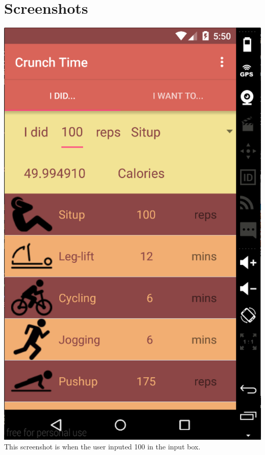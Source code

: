 \documentclass[11pt]{article}
\begin{document}
\section{Screenshots}
\includegraphics[scale=0.3]{shot1.png}\\
This screenshot is when the user inputed 100 in the input box.\\
\end{document}
